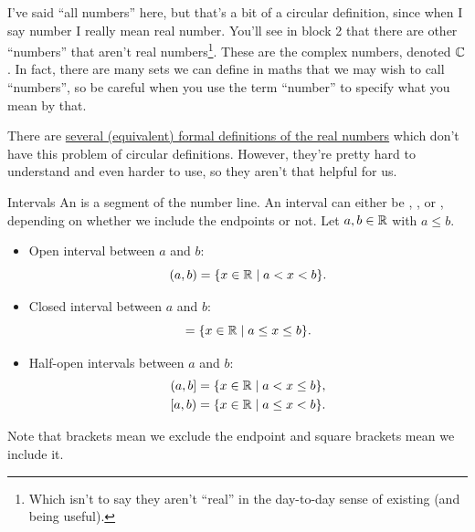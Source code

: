 \documentclass[fleqn]{LectureClass/LectureClass}
\begin{document}
    \begin{remark}{}{}
        I've said \enquote{all numbers} here, but that's a bit of a circular definition, since when I say number I really mean real number.
        You'll see in block 2 that there are other \enquote{numbers} that aren't real numbers\footnote{Which isn't to say they aren't \enquote{real} in the day-to-day sense of existing (and being useful).}.
        These are the complex numbers, denoted \(\mathbb{C}\).
        In fact, there are many sets we can define in maths that we may wish to call \enquote{numbers}, so be careful when you use the term \enquote{number} to specify what you mean by that.
        
        There are \href{https://en.wikipedia.org/wiki/Construction_of_the_real_numbers}{several (equivalent) formal definitions of the real numbers} which don't have this problem of circular definitions.
        However, they're pretty hard to understand and even harder to use, so they aren't that helpful for us.
    \end{remark}
    
    \begin{dfn}{Intervals}{}
        An  is a segment of the number line.
        An interval can either be , , or , depending on whether we include the endpoints or not.
        Let \(a, b \in \mathbb{R}\) with \(a \le b\).
        \begin{itemize}
            \item Open interval between \(a\) and \(b\):
            \begin{equation}
                (a, b) = \{x \in \mathbb{R} \mid a < x < b\}.
            \end{equation}
            \item Closed interval between \(a\) and \(b\):
            \begin{equation}
                [a, b] = \{x \in \reals \mid a \le x \le b\}.
            \end{equation}
            \item Half-open intervals between \(a\) and \(b\):
            \begin{align}
                (a, b] &= \{x \in \mathbb{R} \mid a < x \le b\},\\
                [a, b) &= \{x \in \mathbb{R} \mid a \le x < b\}.
            \end{align}
        \end{itemize}
        Note that brackets mean we exclude the endpoint and square brackets mean we include it.
    \end{dfn}
    
\end{document}
